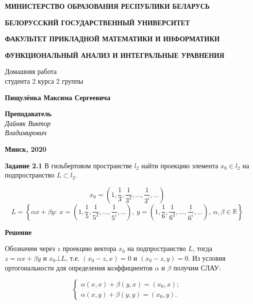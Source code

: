 \documentclass[12pt, a4paper]{article}
\begin{document}
\begin{titlepage}


  
  \centerline{\large \bf МИНИСТЕРСТВО ОБРАЗОВАНИЯ РЕСПУБЛИКИ БЕЛАРУСЬ}
  \bigskip
  \bigskip
  \centerline{\large \bf БЕЛОРУССКИЙ ГОСУДАРСТВЕННЫЙ УНИВЕРСИТЕТ}
  \bigskip
  \bigskip
  \centerline{\large \bf ФАКУЛЬТЕТ ПРИКЛАДНОЙ МАТЕМАТИКИ И ИНФОРМАТИКИ}
  \vfill
  \vfill
  \vfill
  \centerline{\large \bf ФУНКЦИОНАЛЬНЫЙ АНАЛИЗ И ИНТЕГРАЛЬНЫЕ УРАВНЕНИЯ}
  \bigskip
  \bigskip
  \vfill
  \begin{centering}
    {\large
    Домашняя работа\\
    студента 2 курса 2 группы \\}
  \end{centering}
  \centerline{\large \bf Пищулёнка Максима Сергеевича}
  \vfill
  \vfill
  \hfill
  \begin{minipage}{0.25\textwidth}
    {\large{\bf Преподаватель} \\
  {\it Дайняк Виктор \\ Владимирович}}
  \end{minipage}
  \vfill
  \vfill
  \centerline{\Large \bf Минск, 2020}
  
  \end{titlepage}

\begin{center}
\end{center}

\textbf{Задание 2.1} В гильбертовом пространстве $l_2$ найти проекцию элемента
$x_0 \in l_2$ на подпространство $L \subset l_2$.

\[x_0 = \left(1, \frac{1}{3}, \frac{1}{3^2},\dots , \frac{1}{3^i}, \dots \right)\]
\[L = \left\{ \alpha x + \beta y:\ 
x = \left( 1, \frac{1}{5}, \frac{1}{5^2},\dots, \frac{1}{5^i}, \dots  \right),\ 
y = \left( 1, \frac{1}{6}, \frac{1}{6^2},\dots , \frac{1}{6^i},\dots  \right)
,\ \alpha, \beta \in \mathbb{R}  \right\}\]


\textbf{Решение}

Обозначим через $z$ проекцию вектора $x_0$ на подпространство $L$, тогда 
$z=\alpha x + \beta y$ и $x_0 \bot L$, т.е. $(x_0 - z, x) = 0$ и $(x_0 - z, y)=0$.
Из условия ортогональности для определения коэффициентов $\alpha$ и $\beta$ 
получим СЛАУ:

\[
\begin{cases}
  \alpha (x, x) + \beta (y, x) = (x_0, x);\\
  \alpha (x, y) + \beta (y, y) = (x_0, y).
\end{cases}
\]
\end{document}
